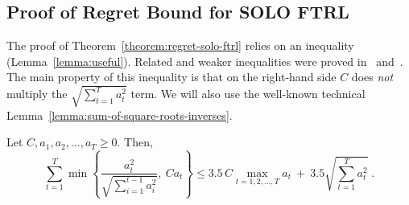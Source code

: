 \subsection{Proof of Regret Bound for \textsc{SOLO FTRL}}
\label{section:solo-ftrl-regret-bound}

The proof of Theorem~\ref{theorem:regret-solo-ftrl} relies on an inequality
(Lemma~\ref{lemma:useful}).  Related and weaker inequalities were proved
in~\cite{Auer-Cesa-Bianchi-Gentile-2002} and~\cite{Jaksch-Ortner-Auer-2010}.
The main property of this inequality is that on the right-hand side $C$ does
\emph{not} multiply the $\sqrt{\sum_{t=1}^T a_t^2}$ term.  We will also use the
well-known technical Lemma~\ref{lemma:sum-of-square-roots-inverses}.

\begin{lemma}
\label{lemma:useful}
Let $C, a_1, a_2, \dots, a_T \ge 0$. Then,
$$
\sum_{t=1}^T \min \left\{ \frac{a_t^2}{\sqrt{\sum_{i=1}^{t-1} a_i^2}}, \ C a_t \right\}
\le 3.5 \, C \max_{t=1,2,\dots,T} a_t \ + \ 3.5 \sqrt{\sum_{t=1}^T a_t^2} \; .
$$
\end{lemma}
